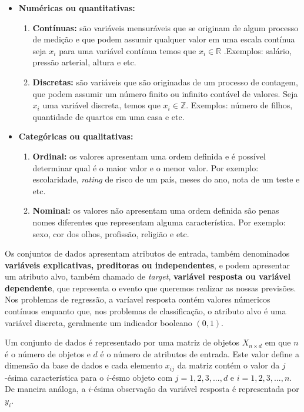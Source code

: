 \begin{itemize}
    \item \textbf{Numéricas ou quantitativas:}
    \begin{enumerate}
        \item \textbf{Contínuas:} são variáveis mensuráveis que se originam de algum processo de medição e que podem assumir qualquer valor em uma escala contínua seja $x_i$ para uma variável contínua temos que $x_i\in\mathbb{R}$ .Exemplos: salário, pressão arterial, altura e etc.
        \item \textbf{Discretas:} são variáveis que são originadas de um processo de contagem, que podem assumir um número finito ou infinito contável de valores. Seja $x_i$ uma variável discreta, temos que $x_i\in\mathbb{Z}$. Exemplos: número de filhos, quantidade de quartos em uma casa e etc.
    \end{enumerate}
    \item \textbf{Categóricas ou qualitativas:}
        \begin{enumerate}
        \item \textbf{Ordinal:} os valores apresentam uma ordem definida e é possível determinar qual é o maior valor e o menor valor. Por exemplo: escolaridade, \textit{rating} de risco de um país, meses do ano, nota de um teste e etc.
        \item \textbf{Nominal:} os valores não apresentam uma ordem definida são penas nomes diferentes que representam alguma característica. Por exemplo: sexo, cor dos olhos, profissão, religião e etc.
    \end{enumerate}
\end{itemize}
Os conjuntos de dados apresentam atributos de entrada, também denominados \textbf{variáveis
explicativas, preditoras ou independentes}, e podem apresentar um atributo alvo, também chamado de \textit{target}, \textbf{variável resposta ou variável dependente}, que representa o evento que queremos realizar as nossas previsões. Nos problemas de regressão, a varíavel resposta contém valores númericos contínuos enquanto que, nos problemas de classificação, o atributo alvo é uma variável discreta, geralmente um indicador booleano $(0,1)$.

Um conjunto de dados é representado por uma matriz de objetos $X_{n\times d}$ em que $n$ é o número de objetos e $d$ é o número de atributos de entrada. Este valor define a dimensão da base de dados e cada elemento $x_{ij}$ da matriz contém o valor da $j$-ésima característica para o $i$-ésmo objeto com $j=1,2,3,...,d$ e $i=1,2,3,...,n$. De maneira análoga, a $i$-ésima observação da variável resposta é representada por $y_i$.
